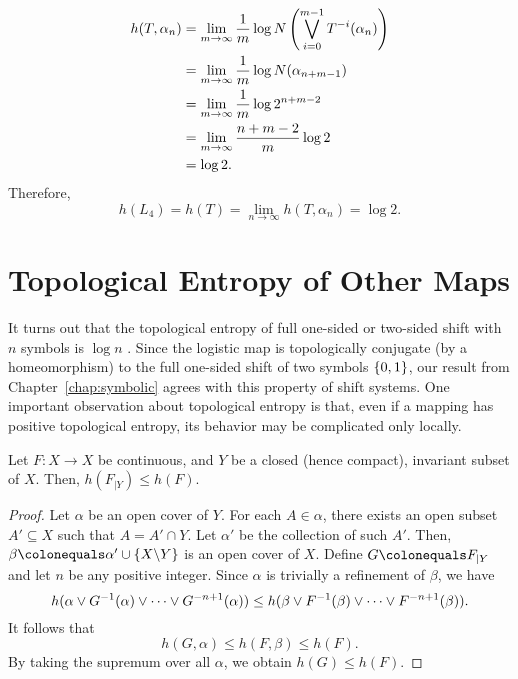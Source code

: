 \documentclass[10pt,twoside,draft]{book}
\begin{document}
\begin{align*}
  h(T, \alpha_n)
  &= \lim\limits_{m \to \infty} \frac{1}{m} \log N\left (  \bigvee\limits_{i = 0}^{m-1} T^{-i}(\alpha_n) \right )  \\
  &= \lim\limits_{m \to \infty} \frac{1}{m} \log N(\alpha_{n+m-1})  \\
  &= \lim\limits_{m \to \infty} \frac{1}{m} \log 2^{n + m - 2}  \\
  &= \lim\limits_{m \to \infty} \frac{n + m - 2}{m} \log 2 \\
  &= \log 2.
\end{align*}
Therefore,
\begin{equation*}
  h(L_4) = h(T) = \lim\limits_{n \to \infty} h(T, \alpha_n) = \log 2.
\end{equation*}

\section{Topological Entropy of Other Maps}
It turns out that the topological entropy of full one-sided or two-sided shift with $n$ symbols is $\log n$ \citep[p.177]{walters}.
Since the logistic map is topologically conjugate (by a homeomorphism) to the full one-sided shift of two symbols $\left \{ 0,1 \right \}$, our result from Chapter~\ref{chap:symbolic} agrees with this property of shift systems.
One important observation about topological entropy is that, even if a mapping has positive topological entropy, its behavior may be complicated only locally.
\begin{proposition}
  Let $F: X \to X$ be continuous, and $Y$ be a closed (hence compact), invariant subset of $X$.
  Then, $h(F_{|Y}) \leq h(F)$.
  \label{prop:local-entropy}
  \begin{proof}
    Let $\alpha$ be an open cover of $Y$.
    For each $A \in \alpha$, there exists an open subset $A' \subseteq X$ such that $A = A' \cap Y$.
    Let $\alpha'$ be the collection of such $A'$.
    Then, $\beta \ceq \alpha' \cup \set{X\bs Y}$ is an open cover of $X$.
    Define $G \ceq F_{|Y}$ and let $n$ be any positive integer.
    Since $\alpha$ is trivially a refinement of $\beta$, we have
    \begin{equation*}
      h(\alpha \vee G^{-1}(\alpha) \vee \cdots \vee G^{-n+1}(\alpha)) 
      \leq
      h(\beta \vee F^{-1}(\beta) \vee \cdots \vee F^{-n+1}(\beta)).
    \end{equation*}
    It follows that
    \begin{equation*}
      h(G, \alpha) \leq h(F, \beta) \leq h(F).
    \end{equation*}
    By taking the supremum over all $\alpha$, we obtain $h(G) \leq h(F)$.
  \end{proof}
\end{proposition}
\end{document}
